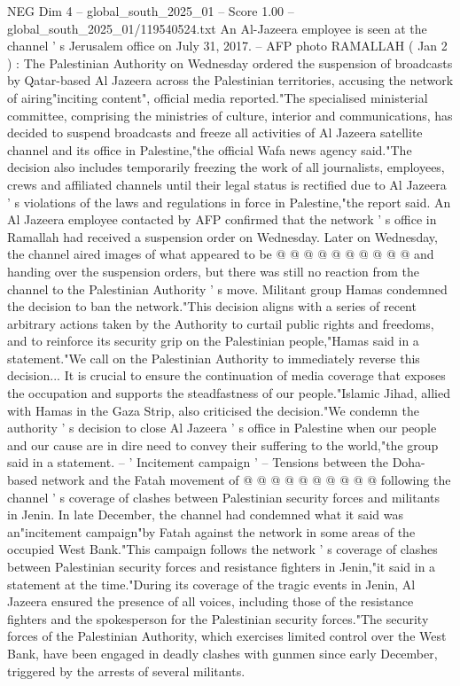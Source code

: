 \begin{textsample}{NEG Dim 4 – global\_south\_2025\_01 – Score 1.00 – global\_south\_2025\_01/119540524.txt}  \label{ex:f4_neg_449}
An Al-Jazeera employee is seen at the channel ' s Jerusalem office on July 31, 2017. -- AFP photo RAMALLAH ( Jan 2 ) : The Palestinian Authority on Wednesday ordered the suspension of broadcasts by Qatar-based Al Jazeera across the Palestinian territories, accusing the network of airing"inciting content", official media reported."The specialised ministerial committee, comprising the ministries of culture, interior and communications, has decided to suspend broadcasts and freeze all activities of Al Jazeera satellite channel and its office in Palestine,"the official Wafa news agency said."The decision also includes temporarily freezing the work of all journalists, employees, crews and affiliated channels until their legal status is rectified due to Al Jazeera ' s violations of the laws and regulations in force in Palestine,"the report said.
An Al Jazeera employee contacted by AFP confirmed that the network ' s office in Ramallah had received a suspension order on Wednesday.
Later on Wednesday, the channel aired images of what appeared to be @ @ @ @ @ @ @ @ @ @ and handing over the suspension orders, but there was still no reaction from the channel to the Palestinian Authority ' s move.
Militant group Hamas condemned the decision to ban the network."This decision aligns with a series of recent arbitrary actions taken by the Authority to curtail public rights and freedoms, and to reinforce its security grip on the Palestinian people,"Hamas said in a statement."We call on the Palestinian Authority to immediately reverse this decision...
It is crucial to ensure the continuation of media coverage that exposes the occupation and supports the steadfastness of our people."Islamic Jihad, allied with Hamas in the Gaza Strip, also criticised the decision."We condemn the authority ' s decision to close Al Jazeera ' s office in Palestine when our people and our cause are in dire need to convey their suffering to the world,"the group said in a statement. -- ' Incitement campaign ' -- Tensions between the Doha-based network and the Fatah movement of @ @ @ @ @ @ @ @ @ @ following the channel ' s coverage of clashes between Palestinian security forces and militants in Jenin.
In late December, the channel had condemned what it said was an"incitement campaign"by Fatah against the network in some areas of the occupied West Bank."This campaign follows the network ' s coverage of clashes between Palestinian security forces and resistance fighters in Jenin,"it said in a statement at the time."During its coverage of the tragic events in Jenin, Al Jazeera ensured the presence of all voices, including those of the resistance fighters and the spokesperson for the Palestinian security forces."The security forces of the Palestinian Authority, which exercises limited control over the West Bank, have been engaged in deadly clashes with gunmen since early December, triggered by the arrests of several militants.

\end{textsample}

